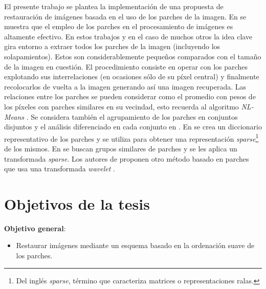 \begin{introduction}
El presente trabajo se plantea la implementaci\'on de una propuesta de restauraci\'on de im\'agenes basada en el uso de los parches de la imagen. En \cite{buades2005review,chatterjee2009clustering,yu2010image,yu2011solving,dong2011image,dong2011sparsity,zoran2011learning,elad2006image,mairal2007sparse,mairal2009non,zeyde2010single,dabov2007image,li2008patch} se muestra que el empleo de los parches en el procesamiento de im\'agenes es altamente efectivo. En estos trabajos y en el caso de muchos otros la idea clave gira entorno a extraer todos los parches de la imagen (incluyendo los solapamientos). Estos son considerablemente pequeños comparados con el tamaño de la imagen en cuesti\'on. El procedimiento consiste en operar con los parches explotando sus interrelaciones (en ocasiones s\'olo de su p\'ixel central) y finalmente recolocarlos de vuelta a la imagen generando as\'i una imagen recuperada. Las relaciones entre los parches se pueden considerar como el promedio con pesos de los p\'ixeles con parches similares en su vecindad, esto recuerda al algoritmo \textit{NL-Means} \cite{buades2005review}. Se considera tambi\'en el agrupamiento de los parches en conjuntos disjuntos y el análisis diferenciado en cada conjunto en \cite{chatterjee2009clustering,yu2010image,yu2011solving,dong2011image,dong2011sparsity,zoran2011learning}. En \cite{elad2006image,mairal2007sparse,mairal2009non,zeyde2010single} se crea un diccionario representativo de los parches y se utiliza para obtener una representaci\'on \textit{sparse}\footnote{Del ingl\'es \textit{sparse}, término que caracteriza matrices o representaciones ralas.} de los mismos. En \cite{mairal2009non,dabov2007image,li2008patch} se buscan grupos similares de parches y se les aplica un transformada \textit{sparse}. Los autores de \cite{ram2011generalized,ram2012redundant} proponen otro m\'etodo basado en parches que usa una transformada \textit{wavelet} \cite{torrence1998practical}.

\section*{Objetivos de la tesis}

\qquad

\textbf{Objetivo general}: \begin{itemize}
\item Restaurar im\'agenes mediante un esquema basado en la ordenaci\'on suave de los parches.
\end{itemize}


\end{introduction}
